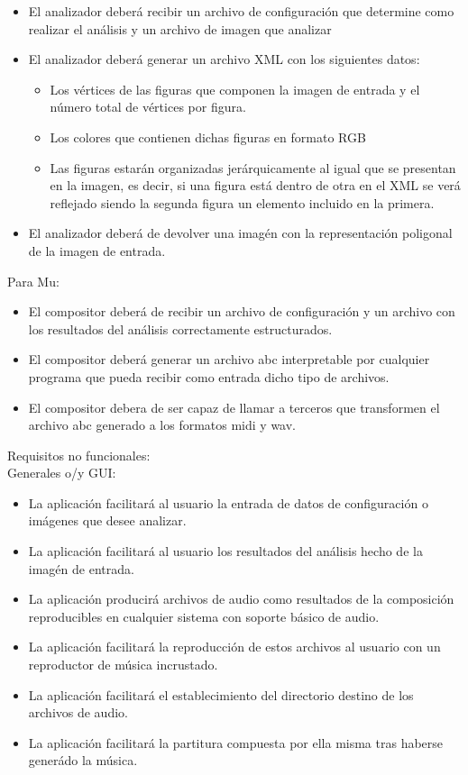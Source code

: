  \begin{itemize}
	\item El analizador deberá recibir un archivo de configuración que determine como realizar el análisis y un archivo de imagen que analizar
	\item El analizador deberá generar un archivo XML con los siguientes datos:
	\begin{itemize}
		\item Los vértices de las figuras que componen la imagen de entrada y el número total de vértices por figura.
		\item Los  colores que contienen dichas figuras en formato RGB
		\item Las figuras estarán organizadas jerárquicamente al igual que se presentan en la imagen, es decir, si una figura está dentro de otra en el XML se verá reflejado siendo la segunda figura un elemento incluido en la primera.
	\end{itemize}
	\item El analizador deberá de devolver una imagén con la representación poligonal de la imagen de entrada.
 \end{itemize}
 Para Mu:
 \begin{itemize}
	\item El compositor deberá de recibir un archivo de configuración y un archivo con los resultados del análisis correctamente estructurados.
	\item El compositor deberá generar un archivo abc interpretable por cualquier programa que pueda recibir como entrada dicho tipo de archivos.
	\item El compositor debera de ser capaz de llamar a terceros que transformen el archivo abc generado a los formatos midi y wav.
 \end{itemize}
Requisitos no funcionales:
\\Generales o/y GUI:
\begin{itemize}
	\item La aplicación facilitará al usuario la entrada de datos de configuración o imágenes que desee analizar.
	\item La aplicación facilitará al usuario los resultados del análisis hecho de la imagén de entrada.
	\item La aplicación producirá archivos de audio como resultados de la composición reproducibles en cualquier sistema con soporte básico de audio.
	\item La aplicación facilitará la reproducción de estos archivos al usuario con un reproductor de música incrustado.
	\item La aplicación facilitará el establecimiento del directorio destino de los archivos de audio.
	\item La aplicación facilitará la partitura compuesta por ella misma tras haberse generádo la música.
\end{itemize}
